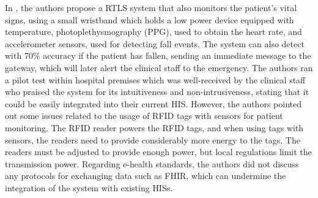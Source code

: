 In \cite{Adame2018}, the authors propose a RTLS system that also monitors the patient's vital signs, using a small wristband which holds a low power device equipped with temperature, photoplethysmography (\acs{PPG}), used to obtain the heart rate, and accelerometer sensors, used for detecting fall events. The system can also detect with 70\% accuracy if the patient has fallen, sending an immediate message to the gateway, which will later alert the clinical staff to the emergency. The authors ran a pilot test within hospital premises which was well-received by the clinical staff who praised the system for its intuitiveness and non-intrusiveness, stating that it could be easily integrated into their current \acs{HIS}. However, the authors pointed out some issues related to the usage of \acs{RFID} tags with sensors for patient monitoring. The \acs{RFID} reader powers the \acs{RFID} tags, and when using tags with sensors, the readers need to provide considerably more energy to the tags. The readers must be adjusted to provide enough power, but local regulations limit the transmission power. Regarding e-health standards, the authors did not discuss any protocols for exchanging data such as \acs{FHIR}, which can undermine the integration of the system with existing \acs{HIS}s. \bigskip

%

